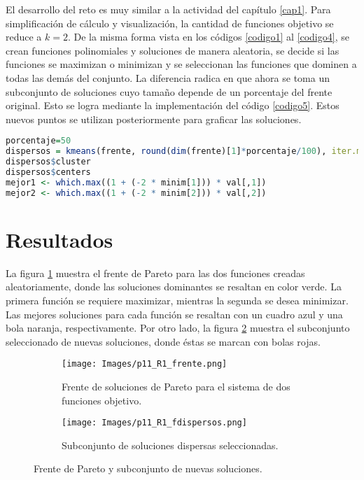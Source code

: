 \documentclass{report}
\begin{document}
El desarrollo del reto es muy similar a la actividad del cap\'itulo \ref{cap1}. Para simplificaci\'on de c\'alculo y visualizaci\'on, la cantidad de funciones objetivo se reduce a $k=2$. De la misma forma vista en los c\'odigos \ref{codigo1} al \ref{codigo4}, se crean funciones polinomiales y soluciones de manera aleatoria, se decide si las funciones se maximizan o minimizan y se seleccionan las funciones que dominen a todas las dem\'as del conjunto. La diferencia radica en que ahora se toma un subconjunto de soluciones cuyo tama\~no depende de un porcentaje del frente original. Esto se logra mediante la implementaci\'on del c\'odigo \ref{codigo5}. Estos nuevos puntos se utilizan posteriormente para graficar las soluciones.

\begin{lstlisting}[caption=Selecci\'on Diversificada de Nuevas Soluciones, label=codigo5, language=R]
porcentaje=50
dispersos = kmeans(frente, round(dim(frente)[1]*porcentaje/100), iter.max = 1000, nstart = 50, algorithm = "Lloyd")
dispersos$cluster
dispersos$centers
mejor1 <- which.max((1 + (-2 * minim[1])) * val[,1])
mejor2 <- which.max((1 + (-2 * minim[2])) * val[,2])
\end{lstlisting}

\section{Resultados}

La figura \ref{fig3a} muestra el frente de Pareto para las dos funciones creadas aleatoriamente, donde las soluciones dominantes se resaltan en color verde. La primera funci\'on se requiere maximizar, mientras la segunda se desea minimizar. Las mejores soluciones para cada funci\'on se resaltan con un cuadro azul y una bola naranja, respectivamente. Por otro lado, la figura \ref{fig3b} muestra el subconjunto seleccionado de nuevas soluciones, donde \'estas se marcan con bolas rojas.

\newpage

\begin{figure}
\centering
    \begin{subfigure}[t]{0.49\textwidth}
         \centering
         \texttt{[image: Images/p11\_R1\_frente.png]}
         \caption{Frente de soluciones de Pareto para el sistema de dos funciones objetivo.}
         \label{fig3a}
     \end{subfigure}
     \begin{subfigure}[t]{0.49\textwidth}
         \centering
         \texttt{[image: Images/p11\_R1\_fdispersos.png]}
         \caption{Subconjunto de soluciones dispersas seleccionadas.}
         \label{fig3b}
     \end{subfigure}
    \caption{Frente de Pareto y subconjunto de nuevas soluciones.}
    \label{fig3}
\end{figure}
\end{document}
